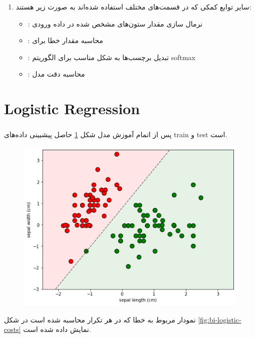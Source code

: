 \documentclass[]{article}
\begin{document}
\begin{enumerate}
	\item سایر توابع کمکی که در قسمت‌های مختلف استفاده شده‌اند به صورت زیر هستند:
	\begin{itemize}
		\item {}: نرمال سازی مقدار ستون‌های مشخص شده در داده ورودی
		\item {}: محاسبه مقدار خطا برای 
		\item {}: تبدیل برچسب‌ها به شکل مناسب برای الگوریتم softmax
		\item {}: محاسبه دقت مدل
	\end{itemize}
\end{enumerate}

\newpage

\part{Logistic Regression}
\section{\textbf{}}
پس از اتمام آموزش مدل شکل \ref{fig:bi-logistic-train-small} حاصل پیشبینی داده‌های train و test است.

\begin{figure}[h]
	\centering
	\includegraphics[width=0.7\linewidth]{bi-logistic-train-small}
	\caption{}
	\label{fig:bi-logistic-train-small}
\end{figure}

نمودار مربوط به خطا که در هر تکرار محاسبه شده است در شکل \ref{fig:bi-logistic-costs} نمایش داده شده است.
\end{document}
